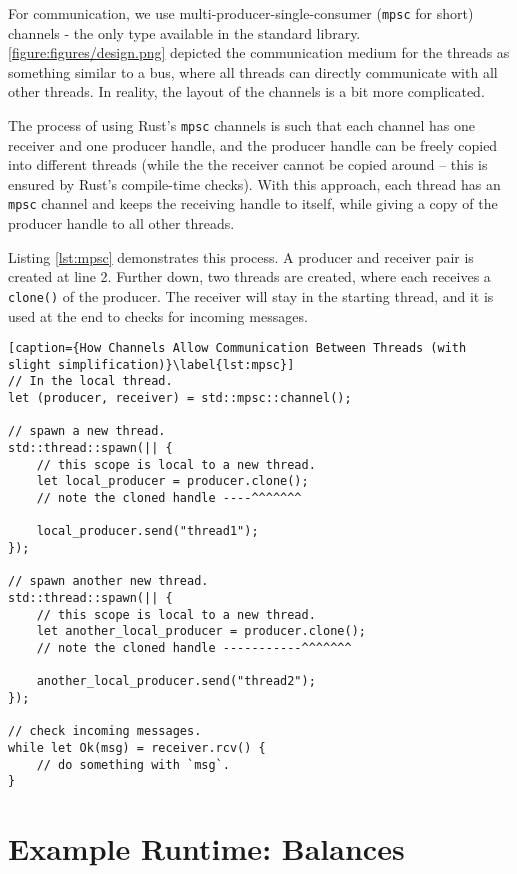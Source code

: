 For communication, we use multi-producer-single-consumer\cite{StdSyncMpsc} (\texttt{mpsc} for short)
channels - the only type available in the standard library. \ref{figure:figures/design.png} depicted
the communication medium for the threads as something similar to a bus, where all threads can
directly communicate with all other threads. In reality, the layout of the channels is a bit more
complicated.

The process of using Rust's \texttt{mpsc} channels is such that each channel has one receiver and
one producer handle, and the producer handle can be freely copied into different threads (while the
the receiver cannot be copied around -- this is ensured by Rust's compile-time checks). With this
approach, each thread has an \texttt{mpsc} channel and keeps the receiving handle to itself, while
giving a copy of the producer handle to all other threads.

Listing \ref{lst:mpsc} demonstrates this process. A producer and receiver pair is created at line
2. Further down, two threads are created, where each receives a \texttt{clone()} of the producer. The
receiver will stay in the starting thread, and it is used at the end to checks for incoming
messages.

\begin{lstlisting}[caption={How Channels Allow Communication Between Threads (with slight simplification)}\label{lst:mpsc}]
// In the local thread.
let (producer, receiver) = std::mpsc::channel();

// spawn a new thread.
std::thread::spawn(|| {
    // this scope is local to a new thread.
    let local_producer = producer.clone();
    // note the cloned handle ----^^^^^^^

    local_producer.send("thread1");
});

// spawn another new thread.
std::thread::spawn(|| {
    // this scope is local to a new thread.
    let another_local_producer = producer.clone();
    // note the cloned handle -----------^^^^^^^

    another_local_producer.send("thread2");
});

// check incoming messages.
while let Ok(msg) = receiver.rcv() {
    // do something with `msg`.
}
\end{lstlisting}

\section{Example Runtime: Balances} \label{chap_impl:sec:balances}

